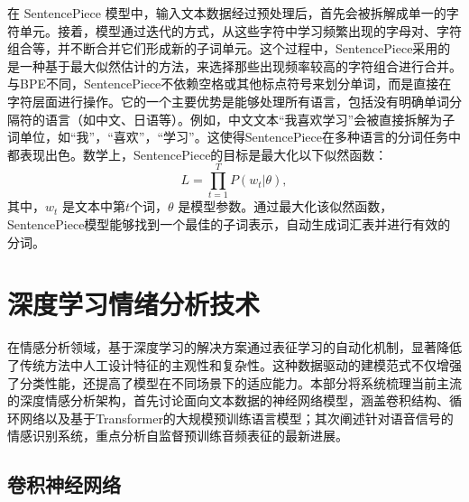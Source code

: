 在 SentencePiece 模型中，输入文本数据经过预处理后，首先会被拆解成单一的字符单元。接着，模型通过迭代的方式，从这些字符中学习频繁出现的字母对、字符组合等，并不断合并它们形成新的子词单元。这个过程中，SentencePiece采用的是一种基于最大似然估计的方法，来选择那些出现频率较高的字符组合进行合并。与BPE不同，SentencePiece不依赖空格或其他标点符号来划分单词，而是直接在字符层面进行操作。它的一个主要优势是能够处理所有语言，包括没有明确单词分隔符的语言（如中文、日语等）。例如，中文文本“我喜欢学习”会被直接拆解为子词单位，如“我”，“喜欢”，“学习”。这使得SentencePiece在多种语言的分词任务中都表现出色。数学上，SentencePiece的目标是最大化以下似然函数：
\begin{equation}
    L = \prod_{t=1}^{T} P(w_t | \theta),
\end{equation}
其中，$w_t$ 是文本中第$t$个词，$\theta$ 是模型参数。通过最大化该似然函数，SentencePiece模型能够找到一个最佳的子词表示，自动生成词汇表并进行有效的分词。

\section{深度学习情绪分析技术}



在情感分析领域，基于深度学习的解决方案通过表征学习的自动化机制，显著降低了传统方法中人工设计特征的主观性和复杂性。这种数据驱动的建模范式不仅增强了分类性能，还提高了模型在不同场景下的适应能力。本部分将系统梳理当前主流的深度情感分析架构，首先讨论面向文本数据的神经网络模型，涵盖卷积结构、循环网络以及基于Transformer的大规模预训练语言模型；其次阐述针对语音信号的情感识别系统，重点分析自监督预训练音频表征的最新进展。

\subsection{卷积神经网络}


